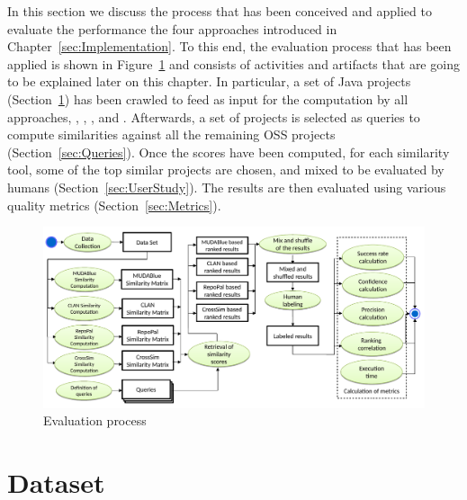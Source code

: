 




In this section we discuss the process that has been conceived and applied to evaluate the performance the four approaches introduced in Chapter~\ref{sec:Implementation}. To this end, the evaluation process that has been applied is shown in Figure~\ref{fig:EvaluationProcess} and consists of activities and artifacts that are going to be explained later on this chapter. In particular, a set of Java projects (Section~\ref{sec:Dataset}) has been crawled to feed as input for the computation by all approaches, \ie \MUDABlue, \CLAN, \RepoPal, and \CrossSim. Afterwards, a set of projects is selected as queries to compute similarities against all the remaining OSS projects (Section~\ref{sec:Queries}). Once the scores have been computed, for each similarity tool, some of the top similar projects are chosen, and mixed to be evaluated by humans (Section~\ref{sec:UserStudy}). The results are then evaluated using various quality metrics (Section~\ref{sec:Metrics}).


\begin{figure}[h!]
	\centering
	\includegraphics[width=0.99\linewidth]{images/EvaluationProcess}
	\caption{Evaluation process}
	\label{fig:EvaluationProcess}
\end{figure}








\section{Dataset} \label{sec:Dataset}

